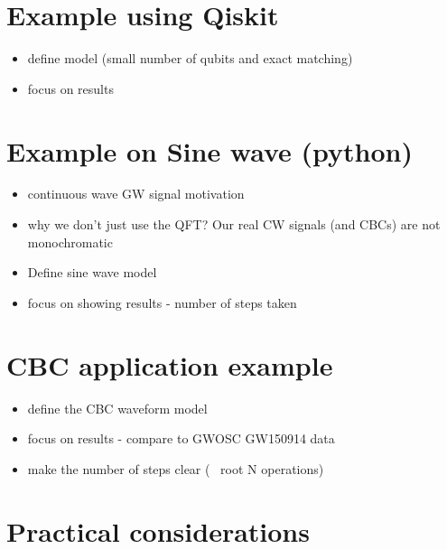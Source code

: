 \documentclass[aps,prd,nofootinbib,twocolumn,reprint,superscriptaddress,showpacs,showkeys,longbibliography]{revtex4-1}
\begin{document}
\section{Example using Qiskit}\label{sec:qizkitexample}

\begin{itemize}
\item define model (small number of qubits and exact matching)
\item focus on results
\end{itemize}

\section{Example on Sine wave (python)}\label{sec:sineexample}

\begin{itemize}
\item continuous wave GW signal motivation
\item why we don't just use the QFT? Our real CW signals (and CBCs) are not monochromatic
\item Define sine wave model
\item focus on showing results - number of steps taken
\end{itemize}

\section{CBC application example}\label{sec:cbcexample}

\begin{itemize}
\item define the CBC waveform model
\item focus on results - compare to GWOSC GW150914 data
\item make the number of steps clear (~ root N operations)
\end{itemize}

\section{Practical considerations}\label{sec:intro}
\end{document}
